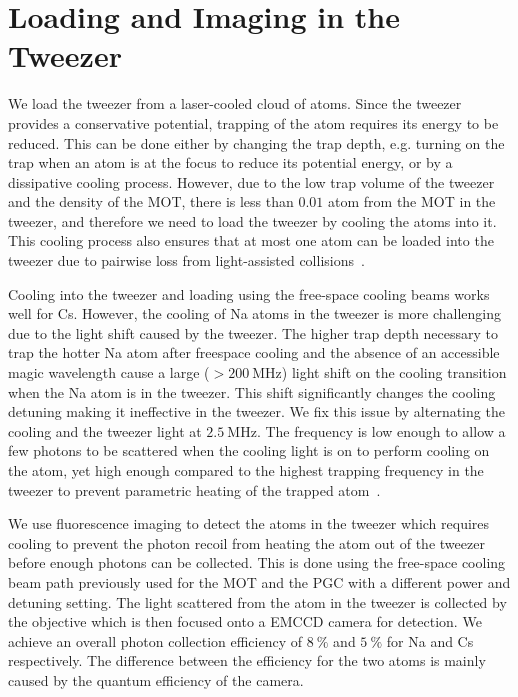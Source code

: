 \section{Loading and Imaging in the Tweezer}
\label{ch:loading:loading}

We load the tweezer from a laser-cooled cloud of atoms.
Since the tweezer provides a conservative potential,
trapping of the atom requires its energy to be reduced.
This can be done either by changing the trap depth,
e.g. turning on the trap when an atom is at the focus to reduce its potential energy,
or by a dissipative cooling process.
However, due to the low trap volume of the tweezer and the density of the MOT,
there is less than $0.01$ atom from the MOT in the tweezer,
and therefore we need to load the tweezer by cooling the atoms into it.
This cooling process also ensures that at most one atom can be loaded into the tweezer
due to pairwise loss from light-assisted collisions~\cite{schlosser_sub-poissonian_2001}.

Cooling into the tweezer and loading using the free-space cooling beams works well for Cs.
However, the cooling of Na atoms in the tweezer is more challenging
due to the light shift caused by the tweezer.
The higher trap depth necessary to trap the hotter Na atom after freespace cooling
and the absence of an accessible magic wavelength cause a large ($>\!200~\mathrm{MHz}$)
light shift on the cooling transition when the Na atom is in the tweezer.
This shift significantly changes the cooling detuning making it ineffective in the tweezer.
We fix this issue by alternating the cooling and the tweezer light at $2.5~\mathrm{MHz}$.
The frequency is low enough to allow a few photons to be scattered
when the cooling light is on to perform cooling on the atom,
yet high enough compared to the highest trapping frequency in the tweezer
to prevent parametric heating of the trapped atom~\cite{hutzler_eliminating_2017}.

We use fluorescence imaging to detect the atoms in the tweezer
which requires cooling to prevent the photon recoil from heating the atom out of the tweezer
before enough photons can be collected.
This is done using the free-space cooling beam path previously used for the MOT and the PGC
with a different power and detuning setting.
The light scattered from the atom in the tweezer is collected by the objective
which is then focused onto a EMCCD camera for detection.
We achieve an overall photon collection efficiency of $8~\mathrm{\%}$ and $5~\mathrm{\%}$
for Na and Cs respectively.
The difference between the efficiency for the two atoms
is mainly caused by the quantum efficiency of the camera.

